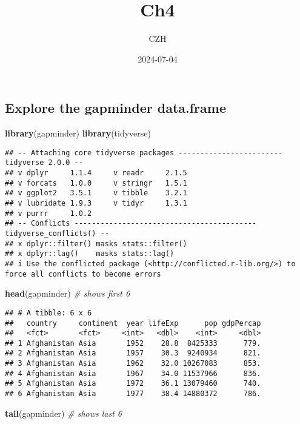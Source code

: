 \documentclass[
]{article}
\title{Ch4}
\author{CZH}
\date{2024-07-04}
\newenvironment{Shaded}{\begin{snugshade}}{\end{snugshade}}
\newcommand{\CommentTok}[1]{\textcolor[rgb]{0.56,0.35,0.01}{\textit{#1}}}
\newcommand{\FunctionTok}[1]{\textcolor[rgb]{0.13,0.29,0.53}{\textbf{#1}}}
\newcommand{\NormalTok}[1]{#1}
\begin{document}
\maketitle

\subsection{Explore the gapminder
data.frame}\label{explore-the-gapminder-data.frame}

\begin{Shaded}
\begin{Highlighting}[]
\FunctionTok{library}\NormalTok{(gapminder)}
\FunctionTok{library}\NormalTok{(tidyverse)}
\end{Highlighting}
\end{Shaded}

\begin{verbatim}
## -- Attaching core tidyverse packages ------------------------ tidyverse 2.0.0 --
## v dplyr     1.1.4     v readr     2.1.5
## v forcats   1.0.0     v stringr   1.5.1
## v ggplot2   3.5.1     v tibble    3.2.1
## v lubridate 1.9.3     v tidyr     1.3.1
## v purrr     1.0.2     
## -- Conflicts ------------------------------------------ tidyverse_conflicts() --
## x dplyr::filter() masks stats::filter()
## x dplyr::lag()    masks stats::lag()
## i Use the conflicted package (<http://conflicted.r-lib.org/>) to force all conflicts to become errors
\end{verbatim}

\begin{Shaded}
\begin{Highlighting}[]
\FunctionTok{head}\NormalTok{(gapminder) }\CommentTok{\# shows first 6}
\end{Highlighting}
\end{Shaded}

\begin{verbatim}
## # A tibble: 6 x 6
##   country     continent  year lifeExp      pop gdpPercap
##   <fct>       <fct>     <int>   <dbl>    <int>     <dbl>
## 1 Afghanistan Asia       1952    28.8  8425333      779.
## 2 Afghanistan Asia       1957    30.3  9240934      821.
## 3 Afghanistan Asia       1962    32.0 10267083      853.
## 4 Afghanistan Asia       1967    34.0 11537966      836.
## 5 Afghanistan Asia       1972    36.1 13079460      740.
## 6 Afghanistan Asia       1977    38.4 14880372      786.
\end{verbatim}

\begin{Shaded}
\begin{Highlighting}[]
\FunctionTok{tail}\NormalTok{(gapminder) }\CommentTok{\# shows last 6}
\end{Highlighting}
\end{Shaded}
\end{document}
